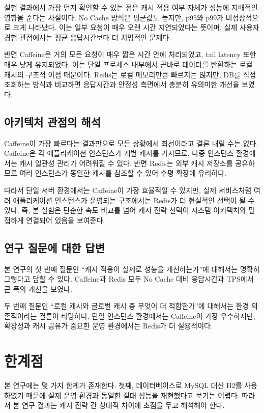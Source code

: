\documentclass[10pt,a4paper,twocolumn]{article}
\begin{document}
실험 결과에서 가장 먼저 확인할 수 있는 점은 캐시 적용 여부 자체가 성능에 지배적인 영향을 준다는 사실이다. No Cache 방식은 평균값도 높지만, p95와 p99가 비정상적으로 크게 나타났다. 이는 일부 요청이 매우 오랜 시간 지연되었다는 뜻이며, 실제 사용자 경험 관점에서는 평균 응답시간보다 더 치명적인 문제다.

반면 Caffeine은 거의 모든 요청이 매우 짧은 시간 안에 처리되었고, tail latency 또한 매우 낮게 유지되었다. 이는 단일 프로세스 내부에서 곧바로 데이터를 반환하는 로컬 캐시의 구조적 이점 때문이다. Redis는 로컬 메모리만큼 빠르지는 않지만, DB를 직접 조회하는 방식과 비교하면 응답시간과 안정성 측면에서 충분히 유의미한 개선을 보였다.

\subsection{아키텍처 관점의 해석}

Caffeine이 가장 빠르다는 결과만으로 모든 상황에서 최선이라고 결론 내릴 수는 없다. Caffeine은 각 애플리케이션 인스턴스가 개별 캐시를 가지므로, 다중 인스턴스 환경에서는 캐시 일관성 관리가 어려워질 수 있다. 반면 Redis는 외부 캐시 저장소를 공유하므로 여러 인스턴스가 동일한 캐시를 참조할 수 있어 수평 확장에 유리하다.

따라서 단일 서버 환경에서는 Caffeine이 가장 효율적일 수 있지만, 실제 서비스처럼 여러 애플리케이션 인스턴스가 운영되는 구조에서는 Redis가 더 현실적인 선택이 될 수 있다. 즉, 본 실험은 단순한 속도 비교를 넘어 캐시 전략 선택이 시스템 아키텍처와 밀접하게 연결되어 있음을 보여준다.

\subsection{연구 질문에 대한 답변}

본 연구의 첫 번째 질문인 ``캐시 적용이 실제로 성능을 개선하는가''에 대해서는 명확히 그렇다고 답할 수 있다. Caffeine과 Redis 모두 No Cache 대비 응답시간과 TPS에서 큰 폭의 개선을 보였다.

두 번째 질문인 ``로컬 캐시와 글로벌 캐시 중 무엇이 더 적합한가''에 대해서는 환경 의존적이라는 결론이 타당하다. 단일 인스턴스 환경에서는 Caffeine이 가장 우수하지만, 확장성과 캐시 공유가 중요한 운영 환경에서는 Redis가 더 실용적이다.

\section{한계점}

본 연구에는 몇 가지 한계가 존재한다. 첫째, 데이터베이스로 MySQL 대신 H2를 사용하였기 때문에 실제 운영 환경과 동일한 절대 성능을 재현했다고 보기는 어렵다. 따라서 본 연구 결과는 캐시 전략 간 상대적 차이에 초점을 두고 해석해야 한다.
\end{document}
